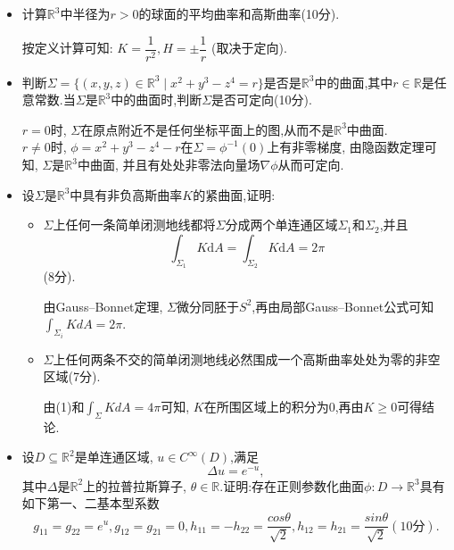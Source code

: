 \begin{itemize}
    \item[2.]计算$\mathbb{R}^{3}$中半径为$r>0$的球面的平均曲率和高斯曲率(10分). 
    \begin{proofc}[解]
            按定义计算可知: $K=\dfrac{1}{r^{2}},H=\pm\dfrac{1}{r}$ (取决于定向).
    \end{proofc}
    \item[3.]判断$\Sigma=\{(x,y,z)\in \mathbb{R}^3\mid x^2+y^3-z^4=r\}$是否是$\mathbb{R}^3$中的曲面,其中$r\in \mathbb{R}$是任意常数.当$\Sigma$是$\mathbb{R}^3$中的曲面时,判断$\Sigma$是否可定向(10分).
    \begin{proofc}
            $r=0$时, $\Sigma$在原点附近不是任何坐标平面上的图,从而不是$\mathbb{R}^{3}$中曲面.\\
            $r\neq 0$时, $\phi=x^{2}+y^{3}-z^{4}-r$在$\Sigma=\phi^{-1}(0)$上有非零梯度, 由隐函数定理可知, $\Sigma$是$\mathbb{R}^{3}$中曲面, 并且有处处非零法向量场$\nabla\phi$从而可定向.
    \end{proofc}
    \item[4.]设$\Sigma$是$\mathbb{R}^3$中具有非负高斯曲率$K$的紧曲面,证明:
    \begin{itemize}
        \item[(1)]$\Sigma$上任何一条简单闭测地线都将$\Sigma$分成两个单连通区域$\Sigma_1$和$\Sigma_2$,并且
        \[  
            \int_{\Sigma_1}K\mathrm{d}A=\int_{\Sigma_2}K\mathrm{d}A=2\pi
        \]
        (8分).
        \begin{proofc}
            由Gauss--Bonnet定理, $\Sigma$微分同胚于$S^{2}$,再由局部Gauss--Bonnet公式可知$\int_{\Sigma_{i}}KdA=2\pi$.
        \end{proofc}
        \item[(2)]$\Sigma$上任何两条不交的简单闭测地线必然围成一个高斯曲率处处为零的非空区域(7分).
        \begin{proofc}
            由(1)和$\int_{\Sigma}KdA=4\pi$可知, $K$在所围区域上的积分为$0$,再由$K\geq 0$可得结论.
        \end{proofc}
    \end{itemize}
    \item[5.]设$D \subseteq \mathbb{R}^2$是单连通区域, $u\in C^\infty(D)$,满足
    $$
        \Delta u=e^{-u},
    $$
    其中$\Delta$是$\mathbb{R}^{2}$上的拉普拉斯算子, $\theta\in\mathbb{R}$.证明:存在正则参数化曲面$\phi:D\to\mathbb{R}^{3}$具有如下第一、二基本型系数
    $$
        g_{11}=g_{22}=e^u,g_{12}=g_{21}=0,h_{11}=-h_{22}=\dfrac{cos\theta}{\sqrt{2}},h_{12}=h_{21}=\dfrac{sin\theta}{\sqrt{2}}(10分).
    $$
    \begin{proofc}

\end{proofc}
\end{itemize}

